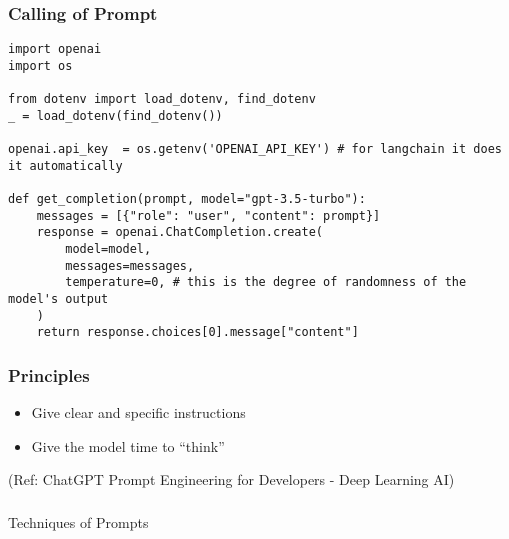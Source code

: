 \begin{frame}[fragile]\frametitle{Calling of Prompt}

\begin{lstlisting}
import openai
import os

from dotenv import load_dotenv, find_dotenv
_ = load_dotenv(find_dotenv())

openai.api_key  = os.getenv('OPENAI_API_KEY') # for langchain it does it automatically

def get_completion(prompt, model="gpt-3.5-turbo"):
    messages = [{"role": "user", "content": prompt}]
    response = openai.ChatCompletion.create(
        model=model,
        messages=messages,
        temperature=0, # this is the degree of randomness of the model's output
    )
    return response.choices[0].message["content"]
\end{lstlisting}
		
\end{frame}

\begin{frame}[fragile]\frametitle{Principles}

\begin{itemize}
\item Give clear and specific instructions
\item Give the model time to “think”
\end{itemize}
		
{\tiny (Ref: ChatGPT Prompt Engineering for Developers - Deep Learning AI)}
		
\end{frame}

\begin{frame}[fragile]\frametitle{}
\begin{center}
{\Large Techniques of Prompts}
\end{center}
\end{frame}


